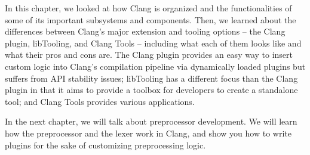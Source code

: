 In this chapter, we looked at how Clang is organized and the functionalities of some of its important subsystems and components. Then, we learned about the differences between Clang's major extension and tooling options – the Clang plugin, libTooling, and Clang Tools – including what each of them looks like and what their pros and cons are. The Clang plugin provides an easy way to insert custom logic into Clang's compilation pipeline via dynamically loaded plugins but suffers from API stability issues; libTooling has a different focus than the Clang plugin in that it aims to provide a toolbox for developers to create a standalone tool; and Clang Tools provides various applications.

In the next chapter, we will talk about preprocessor development. We will learn how the preprocessor and the lexer work in Clang, and show you how to write plugins for the sake of customizing preprocessing logic.